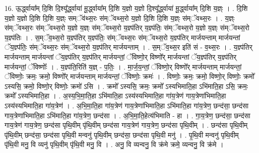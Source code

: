 \documentclass[17pt]{extarticle}
\begin{document}
16. ऊ॒र्द्ध्वाया᳚म् दि॒शि दि॒श्यू᳚र्द्ध्वाया॑ मू॒र्द्ध्वाया᳚म् दि॒शि य॒ज्ञो य॒ज्ञो दि॒श्यू᳚र्द्ध्वाया॑ मू॒र्द्ध्वाया᳚म् दि॒शि य॒ज्ञ्ः । . दि॒शि य॒ज्ञो य॒ज्ञो दि॒शि दि॒शि य॒ज्ञ्ः सम्ॅव॑थ्स॒रः स॑म्ॅवथ्स॒रो य॒ज्ञो दि॒शि दि॒शि य॒ज्ञ्ः स॑म्ॅवथ्स॒रः । . य॒ज्ञ्ः स॑म्ॅवथ्स॒रः स॑म्ॅवथ्स॒रो य॒ज्ञो य॒ज्ञ्ः स॑म्ॅवथ्स॒रो य॒ज्ञ्प॑तिर् य॒ज्ञ्प॑तिः॒ स॑म्ॅवथ्स॒रो य॒ज्ञो य॒ज्ञ्ः स॑म्ॅवथ्स॒रो य॒ज्ञ्प॑तिः । . स॒म्ॅव॒थ्स॒रो य॒ज्ञ्प॑तिर् य॒ज्ञ्प॑तिः॒ स॑म्ॅवथ्स॒रः स॑म्ॅवथ्स॒रो य॒ज्ञ्प॑तिर् मार्जयन्ताम् मार्जयन्तां ॅय॒ज्ञ्प॑तिः॒ स॑म्ॅवथ्स॒रः स॑म्ॅवथ्स॒रो य॒ज्ञ्प॑तिर् मार्जयन्ताम् । . स॒म्ॅव॒थ्स॒र इति॑ सं - व॒थ्स॒रः । . य॒ज्ञ्प॑तिर् मार्जयन्ताम् मार्जयन्तां ॅय॒ज्ञ्प॑तिर् य॒ज्ञ्प॑तिर् मार्जयन्तां॒ ॅविष्णो॒र् विष्णो᳚र् मार्जयन्तां ॅय॒ज्ञ्प॑तिर् य॒ज्ञ्प॑तिर् मार्जयन्तां॒ ॅविष्णोः᳚ । . य॒ज्ञ्प॑ति॒रिति॑ य॒ज्ञ् - प॒तिः॒ । . मा॒र्ज॒य॒न्तां॒ ॅविष्णो॒र् विष्णो᳚र् मार्जयन्ताम् मार्जयन्तां॒ ॅविष्णोः॒ क्रमः॒ क्रमो॒ विष्णो᳚र् मार्जयन्ताम् मार्जयन्तां॒ ॅविष्णोः॒ क्रमः॑ । . विष्णोः॒ क्रमः॒ क्रमो॒ विष्णो॒र् विष्णोः॒ क्रमो᳚ ऽस्यसि॒ क्रमो॒ विष्णो॒र् विष्णोः॒ क्रमो॑ ऽसि । . क्रमो᳚ ऽस्यसि॒ क्रमः॒ क्रमो᳚ ऽस्यभिमाति॒हा ऽभि॑माति॒हा ऽसि॒ क्रमः॒ क्रमो᳚ ऽस्यभिमाति॒हा । . अ॒स्य॒भि॒मा॒ति॒हा ऽभि॑माति॒हा ऽस्य॑स्यभिमाति॒हा गा॑य॒त्रेण॑ गाय॒त्रेणा॑भिमाति॒हा ऽस्य॑स्यभिमाति॒हा गा॑य॒त्रेण॑ । . अ॒भि॒मा॒ति॒हा गा॑य॒त्रेण॑ गाय॒त्रेणा॑भिमाति॒हा ऽभि॑माति॒हा गा॑य॒त्रेण॒ छन्द॑सा॒ छन्द॑सा गाय॒त्रेणा॑भिमाति॒हा ऽभि॑माति॒हा गा॑य॒त्रेण॒ छन्द॑सा । . अ॒भि॒मा॒ति॒हेत्य॑भिमाति - हा । . गा॒य॒त्रेण॒ छन्द॑सा॒ छन्द॑सा गाय॒त्रेण॑ गाय॒त्रेण॒ छन्द॑सा पृथि॒वीम् पृ॑थि॒वीम् छन्द॑सा गाय॒त्रेण॑ गाय॒त्रेण॒ छन्द॑सा पृथि॒वीम् । . छन्द॑सा पृथि॒वीम् पृ॑थि॒वीम् छन्द॑सा॒ छन्द॑सा पृथि॒वी मन्वनु॑ पृथि॒वीम् छन्द॑सा॒ छन्द॑सा पृथि॒वी मनु॑ । . पृ॒थि॒वी मन्वनु॑ पृथि॒वीम् पृ॑थि॒वी मनु॒ वि व्यनु॑ पृथि॒वीम् पृ॑थि॒वी मनु॒ वि । . अनु॒ वि व्यन्वनु॒ वि क्र॑मे क्रमे॒ व्यन्वनु॒ वि क्र॑मे । \newline
\end{document}
